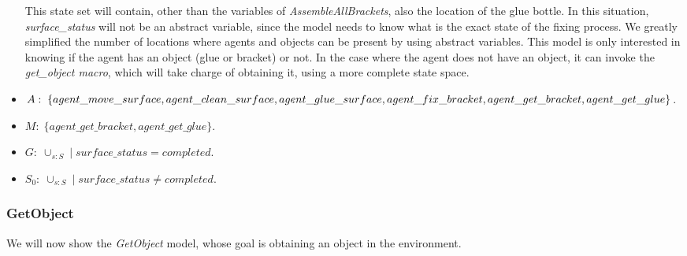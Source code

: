 \begin{itemize}
		This state set will contain, other than the variables of \textit{AssembleAllBrackets}, also the location of the glue bottle. In this situation, \textit{surface\_status} will not be an abstract variable, since the model needs to know what is the exact state of the fixing process. We greatly simplified the number of locations where agents and objects can be present by using abstract variables. This model is only interested in knowing if the agent has an object (glue or bracket) or not. In the case where the agent does not have an object, it can invoke the \textit{get\_object macro}, which will take charge of obtaining it, using a more complete state space.
	\item $A:\;\{agent\_move\_surface,agent\_clean\_surface,agent\_glue\_surface,\\
	agent\_fix\_bracket,agent\_get\_bracket,agent\_get\_glue\}$.
	\item $M:\;\{agent\_get\_bracket,agent\_get\_glue\}$.
	\item $G:\; \cup_{s:S}\; |\; surface\_status=completed$.
	\item $S_0:\; \cup_{s:S}\; |\; surface\_status \neq completed$.
\end{itemize}


\subsubsection{GetObject}
We will now show the \textit{GetObject} model, whose goal is obtaining an object in the environment.

